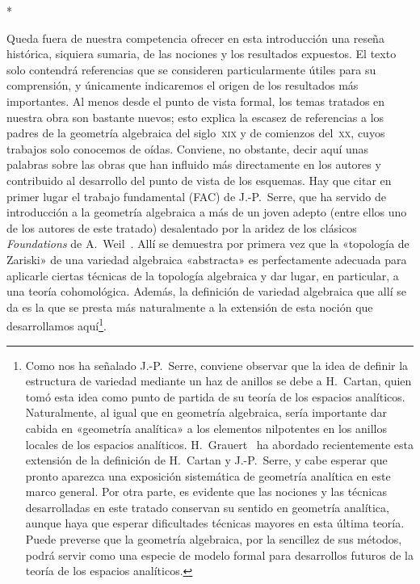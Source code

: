 \bigskip
\begin{center}*\quad*\quad*\end{center}
\bigskip

Queda fuera de nuestra competencia ofrecer en esta introducción una reseña histórica, siquiera sumaria, de las nociones y los resultados expuestos.
El texto solo contendrá referencias que se consideren particularmente útiles para su comprensión, y únicamente indicaremos el origen de los resultados más importantes.
Al menos desde el punto de vista formal, los temas tratados en nuestra obra son bastante nuevos; esto explica la escasez de referencias a los padres de la geometría algebraica del siglo~\textsc{xix} y de comienzos del~\textsc{xx}, cuyos trabajos solo conocemos de oídas.
Conviene, no obstante, decir aquí unas palabras sobre las obras que han influido más directamente en los autores y contribuido al desarrollo del punto de vista de los esquemas.
Hay que citar en primer lugar el trabajo fundamental (FAC) de J.-P.~Serre, que ha servido de introducción a la geometría algebraica a más de un joven adepto (entre ellos uno de los autores de este tratado) desalentado por la aridez de los clásicos \emph{Foundations} de A.~Weil~\cite{I-18}.
Allí se demuestra por primera vez que la «topología de Zariski» de una variedad algebraica «abstracta» es perfectamente adecuada para aplicarle ciertas técnicas de la topología algebraica y dar lugar, en particular, a una teoría cohomológica.
Además, la definición de variedad algebraica que allí se da es la que se presta más naturalmente a la extensión de esta noción que desarrollamos aquí\footnote{Como nos ha señalado J.-P.~Serre, conviene observar que la idea de definir la estructura de variedad mediante un haz de anillos se debe a H.~Cartan, quien tomó esta idea como punto de partida de su teoría de los espacios analíticos.
Naturalmente, al igual que en geometría algebraica, sería importante dar cabida en «geometría analítica» a los elementos nilpotentes en los anillos locales de los espacios analíticos.
H.~Grauert~\cite{I-5} ha abordado recientemente esta extensión de la definición de H.~Cartan y J.-P.~Serre, y cabe esperar que pronto aparezca una exposición sistemática de geometría analítica en este marco general.
Por otra parte, es evidente que las nociones y las técnicas desarrolladas en este tratado conservan su sentido en geometría analítica, aunque haya que esperar dificultades técnicas mayores en esta última teoría.
Puede preverse que la geometría algebraica, por la sencillez de sus métodos, podrá servir como una especie de modelo formal para desarrollos futuros de la teoría de los espacios analíticos.}.
